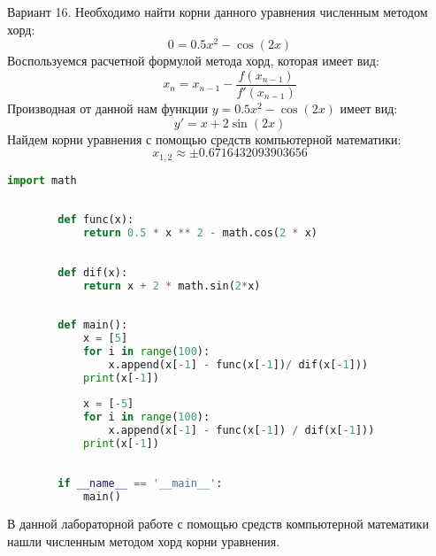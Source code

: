 \documentclass[14pt, a4paper, fleqn]{extarticle}
\begin{document}
	\tableofcontents
	\pagebreak
	Вариант 16. Необходимо найти корни данного уравнения численным методом хорд:
	\[
	0 = 0.5x^2 - \cos(2x)
	\]
	Воспользуемся расчетной формулой метода хорд, которая имеет вид:
	\[
	x_n = x_{n-1} - \dfrac{f(x_{n-1})}{f'(x_{n-1})}
	\]
	Производная от данной нам функции $y = 0.5x^2 - \cos(2x)$ имеет вид:
	\[
	y' = x + 2\sin(2x)
	\]
	Найдем корни уравнения с помощью средств компьютерной математики:
	\[
	x_{1, 2} \approx \pm 0.6716432093903656
	\]
	
	\begin{lstlisting}[language=Python, caption={Реализация метода хорд}]
		import math
		
		
		def func(x):
			return 0.5 * x ** 2 - math.cos(2 * x)
		
		
		def dif(x):
			return x + 2 * math.sin(2*x)
		
		
		def main():
			x = [5]
			for i in range(100):
				x.append(x[-1] - func(x[-1])/ dif(x[-1]))
			print(x[-1])
		
			x = [-5]
			for i in range(100):
				x.append(x[-1] - func(x[-1]) / dif(x[-1]))
			print(x[-1])
		
		
		if __name__ == '__main__':
			main()
	\end{lstlisting}
	В данной лабораторной работе с помощью средств компьютерной математики нашли численным методом хорд корни уравнения.
	
\end{document}
